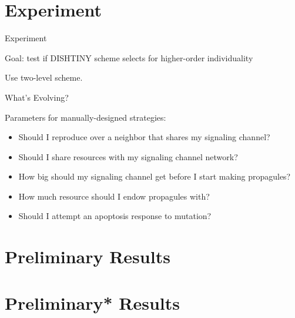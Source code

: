 \section{Experiment}

\begin{frame}{Experiment}

Goal: test if DISHTINY scheme selects for higher-order individuality

\pause

Use two-level scheme.

\end{frame}

\begin{frame}{What's Evolving?}

Parameters for manually-designed strategies:
\pause
\begin{itemize}[<+->]
\item Should I reproduce over a neighbor that shares my signaling channel?
\item Should I share resources with my signaling channel network?
\item How big should my signaling channel get before I start making propagules?
\item How much resource should I endow propagules with?
\item Should I attempt an apoptosis response to mutation?
\end{itemize}
\end{frame}

\section{Preliminary Results}
\section{Preliminary\** Results}


